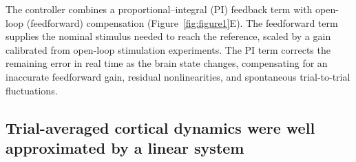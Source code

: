 The controller combines a proportional--integral (PI) feedback term with open-loop (feedforward) compensation (Figure~\ref{fig:figure1}E).
The feedforward term supplies the nominal stimulus needed to reach the reference, scaled by a gain calibrated from open-loop stimulation experiments.
The PI term corrects the remaining error in real time as the brain state changes, compensating for an inaccurate feedforward gain, residual nonlinearities, and spontaneous trial-to-trial fluctuations.
\subsection*{Trial-averaged cortical dynamics were well approximated by a linear system}
